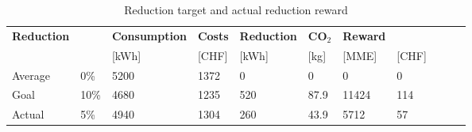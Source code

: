 \documentclass[11pt]{article}
\begin{document}
\begin{table}[H]
\begin{tabular}{ll|llllll|lll}
\textbf{Reduction} & \textbf{} & \textbf{Consumption} & \textbf{Costs} & \textbf{Reduction} & \textbf{CO$_2$} & \textbf{Reward} &           \\
                   &           & {[}kWh{]}            & {[}CHF{]}      & {[}kWh{]}          & {[}kg{]}     & {[}MME{]}       & {[}CHF{]} \\ \hline
Average             & 0\%      & 5200                 & 1372            & 0                & 0        & 0           & 0       \\
Goal             & 10\%      & 4680                 & 1235            & 520                & 87.9         & 11424           & 114       \\
Actual             & 5\%       & 4940                 & 1304            & 260                & 43.9          & 5712            & 57
\end{tabular}
\caption{Reduction target and actual reduction reward}
\label{table_target-actual}
\end{table}
\end{document}

